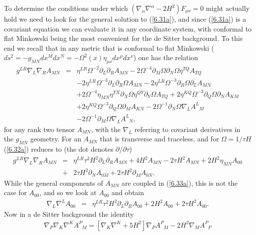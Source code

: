 To determine the conditions under which $(\nabla_{\alpha}\nabla^{\alpha}-2H^2)F_{\mu\nu}=0$ might actually hold we need to look for the general solution to (\ref{6.31a}), and since (\ref{6.31a}) is a covariant equation we can evaluate it in any coordinate system, with conformal to flat Minkowski being the most convenient for the de Sitter background. To this end we recall that in any metric that is conformal to flat Minkowski ($ds^2=-g_{MN}dx^Mdx^N=-\Omega^2(x)\eta_{\mu\nu}dx^{\mu}dx^{\nu}$) one has the relation \cite{mannheim_2012}
%
\begin{eqnarray}
g^{LR}\nabla_{L}\nabla_{R}A_{MN}&=&
\eta^{LR}\Omega^{-2}\partial_{L}\partial_{R}A_{MN}
-2\Omega^{-4}\partial_{M}\Omega\partial_{N}\Omega \eta^{TQ}A_{TQ}
\nonumber\\
&&
-2\eta^{LR}\Omega^{-3}\partial_{L}\partial_{R}\Omega A_{MN}
-2\eta^{LR}\Omega^{-3}\partial_{R}\Omega \partial_{L}A_{MN}
\nonumber\\
&&
+2\Omega^{-4}\eta_{MN}\eta^{TX}\partial_{X}\Omega\eta^{QY} \partial_{Y}\Omega A_{TQ}
+2\eta^{KQ}\Omega^{-3}\partial_{Q}\Omega \partial_{N}A_{KM}
\nonumber\\
&&
+2\eta^{KQ}\Omega^{-3}\partial_{Q}\Omega \partial_{M}A_{KN}
-2\Omega^{-1}\partial_{N}\Omega \nabla_{L}A^{L}_{\phantom{L}M}
\nonumber\\
&&
-2\Omega^{-1}\partial_{M}\Omega \nabla_{L}A^{L}_{\phantom{L}N},
\label{6.32a}
\end{eqnarray}
%
for any rank two tensor $A_{MN}$, with the $\nabla_{L}$ referring to covariant derivatives in the $g_{MN}$ geometry. For an $A_{MN}$ that is transverse and traceless, and for $\Omega=1/\tau H$ (\ref{6.32a}) reduces to  (the dot denotes $\partial/\partial\tau$)
%
\begin{eqnarray}
g^{LR}\nabla_{L}\nabla_{R}A_{MN}&=&
\eta^{LR}\tau^2 H^2\partial_{L}\partial_{R}A_{MN}
+4H^2A_{MN}
-2\tau H^2\dot{A}_{MN}
+2H^2\eta_{MN}A_{00}
\nonumber \\
&+&2\tau H^2\partial_{N}A_{0M}
+2\tau H^2 \partial_{M}A_{0N}.
\label{6.33a}
\end{eqnarray}
%
While the general components of $A_{MN}$ are coupled in (\ref{6.33a}), this is not the case for  $A_{00}$, and so we look at $A_{00}$ and obtain 
%
\begin{eqnarray}
\nabla_{L}\nabla^{L}A_{00}&=&
\eta^{LR}\tau^2 H^2\partial_{L}\partial_{R}A_{00}
+2H^2A_{00}
+2\tau H^2\dot{A}_{00}.
\label{6.34a}
\end{eqnarray}
%
Now in a de Sitter background the identity 
%
\begin{eqnarray}
\nabla_{P}\nabla_{K}\nabla^{K}A^{P}_{\phantom{P}M}
=[\nabla_{K}\nabla^{K}+5H^2]\nabla_{P}A^{P}_{\phantom{P}M}
-2H^2\nabla_{M}A^{P}_{\phantom{P}P}
\end{eqnarray}
